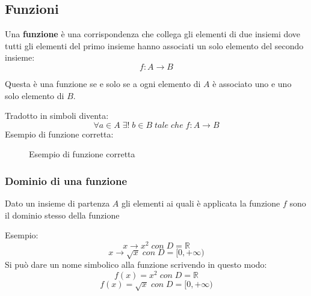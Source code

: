 \documentclass[a4paper]{article}
\theoremstyle{break}
\theoremstyle{break}
\theoremstyle{break}
\theoremstyle{break}
\begin{document}
\subsection{Funzioni}
\begin{definition}
  Una \textbf{funzione} è una corrispondenza che collega gli elementi di due insiemi dove tutti
  gli elementi del primo insieme hanno associati un solo elemento del secondo insieme:
  \[
    f: A \to B
  \]
\end{definition}
Questa è una funzione se e solo se a ogni elemento di \( A \) è associato uno e uno solo elemento di \( B \).

Tradotto in simboli diventa:
\[
  \forall a \in A \;\exists !\; b \in B \;tale\;che\; f: A \to B
\]
Esempio di funzione corretta:
\begin{figure}[H]
  \begin{center}
  \end{center}
  \caption{Esempio di funzione corretta}
\end{figure}

\subsubsection{Dominio di una funzione}
\begin{definition}
  Dato un insieme di partenza \( A \) gli elementi ai quali è applicata la funzione \( f \) sono
  il dominio stesso della funzione
\end{definition}
Esempio:
\[
  x \to x^2\; con\; D=\mathbb{R}
  \] \[
  x \to \sqrt{x}\; con\; D=[0,+\infty)
\]
Si può dare un nome simbolico alla funzione scrivendo in questo modo:
\[
  f(x)=x^2\; con\; D=\mathbb{R}
  \] \[
  f(x)=\sqrt{x}\; con\; D=[0,+\infty)
\]
\end{document}
